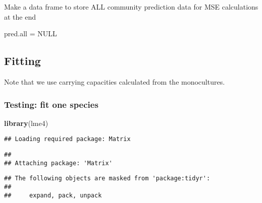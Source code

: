 \documentclass[
]{article}
\newenvironment{Shaded}{\begin{snugshade}}{\end{snugshade}}
\newcommand{\ConstantTok}[1]{\textcolor[rgb]{0.56,0.35,0.01}{#1}}
\newcommand{\FunctionTok}[1]{\textcolor[rgb]{0.13,0.29,0.53}{\textbf{#1}}}
\newcommand{\NormalTok}[1]{#1}
\newcommand{\OtherTok}[1]{\textcolor[rgb]{0.56,0.35,0.01}{#1}}
\begin{document}
Make a data frame to store ALL community prediction data for MSE
calculations at the end

\begin{Shaded}
\begin{Highlighting}[]
\NormalTok{pred.all }\OtherTok{=} \ConstantTok{NULL}
\end{Highlighting}
\end{Shaded}

\hypertarget{fitting}{%
\subsection{Fitting}\label{fitting}}

Note that we use carrying capacities calculated from the monocultures.

\hypertarget{testing-fit-one-species}{%
\subsubsection{Testing: fit one species}\label{testing-fit-one-species}}

\begin{Shaded}
\begin{Highlighting}[]
\FunctionTok{library}\NormalTok{(lme4)}
\end{Highlighting}
\end{Shaded}

\begin{verbatim}
## Loading required package: Matrix
\end{verbatim}

\begin{verbatim}
## 
## Attaching package: 'Matrix'
\end{verbatim}

\begin{verbatim}
## The following objects are masked from 'package:tidyr':
## 
##     expand, pack, unpack
\end{verbatim}
\end{document}
